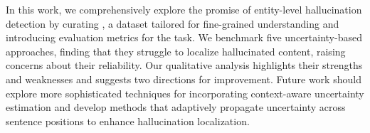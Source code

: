 In this work, we comprehensively explore the promise of entity-level hallucination detection by curating \dataset, a dataset tailored for fine-grained understanding and introducing evaluation metrics for the task. We benchmark five uncertainty-based approaches, finding that they struggle to localize hallucinated content, raising concerns about their reliability. Our qualitative analysis highlights their strengths and weaknesses and suggests two directions for improvement. Future work should explore more sophisticated techniques for incorporating context-aware uncertainty estimation and develop methods that adaptively propagate uncertainty across sentence positions to enhance hallucination localization.